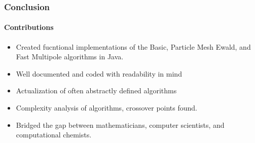 \documentclass[10pt]{beamer}
\begin{document}
\begin{frame}
\frametitle{Conclusion}
\framesubtitle{Contributions}
\begin{itemize}
\item<1-> Created fucntional implementations of the Basic, Particle Mesh Ewald, and Fast Multipole algorithms in Java. 
\item<2-> Well documented and coded with readability in mind
\item<3-> Actualization of often abstractly defined algorithms
\item<4-> Complexity analysis of algorithms, crossover points found.
\item<5-> Bridged the gap between mathematicians, computer scientists, and computational chemists.
\end{itemize}
\end{frame}
\end{document}
